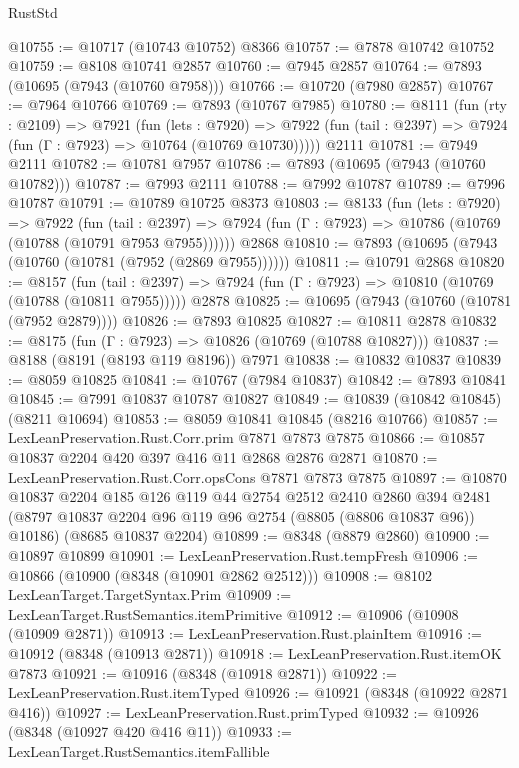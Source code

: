 \begin{lexlean}{RustStd}
\begin{coremodule}
{\begin{coremodule}
{{{{{{{{{{{{{{{{{{{{{{{{{{{{{{{{{{{{{{{{{{{{{{{{{{@10755 := @10717 (@10743 @10752) @8366
@10757 := @7878 @10742 @10752
@10759 := @8108 @10741 @2857
@10760 := @7945 @2857
@10764 := @7893 (@10695 (@7943 (@10760 @7958)))
@10766 := @10720 (@7980 @2857)
@10767 := @7964 @10766
@10769 := @7893 (@10767 @7985)
@10780 := @8111
    (fun (rty : @2109) =>
    @7921
      (fun (lets : @7920) =>
      @7922 (fun (tail : @2397) => @7924 (fun (Γ : @7923) => @10764 (@10769 @10730)))))
    @2111
@10781 := @7949 @2111
@10782 := @10781 @7957
@10786 := @7893 (@10695 (@7943 (@10760 @10782)))
@10787 := @7993 @2111
@10788 := @7992 @10787
@10789 := @7996 @10787
@10791 := @10789 @10725 @8373
@10803 := @8133
    (fun (lets : @7920) =>
    @7922
      (fun (tail : @2397) =>
      @7924 (fun (Γ : @7923) => @10786 (@10769 (@10788 (@10791 @7953 @7955))))))
    @2868
@10810 := @7893 (@10695 (@7943 (@10760 (@10781 (@7952 (@2869 @7955))))))
@10811 := @10791 @2868
@10820 := @8157
    (fun (tail : @2397) => @7924 (fun (Γ : @7923) => @10810 (@10769 (@10788 (@10811 @7955)))))
    @2878
@10825 := @10695 (@7943 (@10760 (@10781 (@7952 @2879))))
@10826 := @7893 @10825
@10827 := @10811 @2878
@10832 := @8175 (fun (Γ : @7923) => @10826 (@10769 (@10788 @10827)))
@10837 := @8188 (@8191 (@8193 @119 @8196)) @7971
@10838 := @10832 @10837
@10839 := @8059 @10825
@10841 := @10767 (@7984 @10837)
@10842 := @7893 @10841
@10845 := @7991 @10837 @10787 @10827
@10849 := @10839 (@10842 @10845) (@8211 @10694)
@10853 := @8059 @10841 @10845 (@8216 @10766)
@10857 := LexLeanPreservation.Rust.Corr.prim @7871 @7873 @7875
@10866 := @10857 @10837 @2204 @420 @397 @416 @11 @2868 @2876 @2871
@10870 := LexLeanPreservation.Rust.Corr.opsCons @7871 @7873 @7875
@10897 := @10870
    @10837
    @2204
    @185
    @126
    @119
    @44
    @2754
    @2512
    @2410
    @2860
    @394
    @2481
    (@8797 @10837 @2204 @96 @119 @96 @2754 (@8805 (@8806 @10837 @96)) @10186)
    (@8685 @10837 @2204)
@10899 := @8348 (@8879 @2860)
@10900 := @10897 @10899
@10901 := LexLeanPreservation.Rust.tempFresh
@10906 := @10866 (@10900 (@8348 (@10901 @2862 @2512)))
@10908 := @8102 LexLeanTarget.TargetSyntax.Prim
@10909 := LexLeanTarget.RustSemantics.itemPrimitive
@10912 := @10906 (@10908 (@10909 @2871))
@10913 := LexLeanPreservation.Rust.plainItem
@10916 := @10912 (@8348 (@10913 @2871))
@10918 := LexLeanPreservation.Rust.itemOK @7873
@10921 := @10916 (@8348 (@10918 @2871))
@10922 := LexLeanPreservation.Rust.itemTyped
@10926 := @10921 (@8348 (@10922 @2871 @416))
@10927 := LexLeanPreservation.Rust.primTyped
@10932 := @10926 (@8348 (@10927 @420 @416 @11))
@10933 := LexLeanTarget.RustSemantics.itemFallible
}}}}}}}}}}}}}}}}}}}}}}}}}}}}}}}}}}}}}}}}}}}}}}}}}}
\end{coremodule}}
\end{coremodule}
\end{lexlean}
